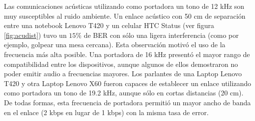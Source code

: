 Las comunicaciones acústicas utilizando como portadora un tono de 12 kHz son muy susceptibles al ruido ambiente. Un enlace acústico con 50 cm de separación entre una notebook Lenovo T420 y un celular HTC Status (ver figura \ref{fig:acudist}) tuvo un $15\%$ de BER con sólo una ligera interferencia (como por ejemplo, golpear una mesa cercana). Esta observación motivó el uso de la frecuencia más alta posible. Una portadora de 16 kHz presentó el mayor rango de compatibilidad entre los dispositivos, aunque algunos de ellos demostraron no poder emitir audio a frecuencias mayores.
Los parlantes de una Laptop Lenovo T420 y otra Laptop Lenovo X60 fueron capaces de establecer un enlace utilizando como portadora un tono de 19.2 kHz, aunque sólo en cortas distancias (20 cm). De todas formas, esta frecuencia de portadora permitió un mayor ancho de banda en el enlace (2 kbps en lugar de 1 kbps) con la misma tasa de error.

%
